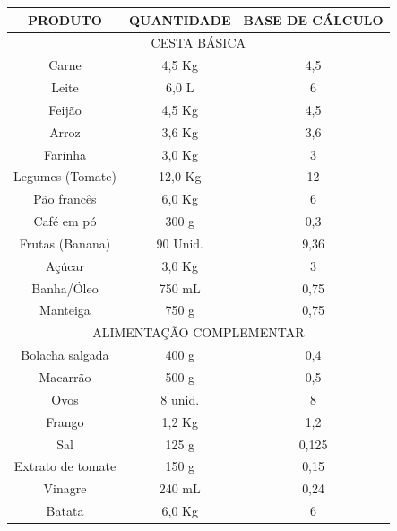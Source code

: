 \documentclass{ifto-tex}
\begin{document}
	\begin{longtable}{|c|c|c|} 
	\hline
	PRODUTO           & QUANTIDADE         & BASE DE CÁLCULO \\
	\hline
	\multicolumn{3}{|c|}{CESTA BÁSICA}                         \\
	\hline
	Carne             & 4,5 Kg             & 4,5             \\
	\hline
	Leite             & 6,0 L              & 6               \\
	\hline
	Feijão            & 4,5 Kg             & 4,5             \\
	\hline
	Arroz             & 3,6 Kg             & 3,6             \\
	\hline
	Farinha           & 3,0 Kg             & 3               \\
	\hline
	Legumes (Tomate)  & 12,0 Kg            & 12              \\
	\hline
	Pão francês       & 6,0 Kg             & 6               \\
	\hline
	Café em pó        & 300 g              & 0,3             \\
	\hline
	Frutas (Banana)   & 90 Unid.           & 9,36            \\
	\hline
	Açúcar            & 3,0 Kg             & 3               \\
	\hline
	Banha/Óleo        & 750 mL             & 0,75            \\
	\hline
	Manteiga          & 750 g              & 0,75            \\
	\hline
	\multicolumn{3}{|c|}{ALIMENTAÇÃO COMPLEMENTAR}             \\
	\hline
	Bolacha salgada   & 400 g              & 0,4             \\
	\hline
	Macarrão          & 500 g              & 0,5             \\
	\hline
	Ovos              & 8 unid.            & 8            \\
	\hline
	Frango            & 1,2 Kg             & 1,2             \\
	\hline
	Sal               & 125 g              & 0,125           \\
	\hline
	Extrato de tomate & 150 g              & 0,15            \\
	\hline
	Vinagre           & 240 mL             & 0,24            \\
	\hline
	Batata            & 6,0 Kg             & 6               \\

\end{longtable}
\end{document}
